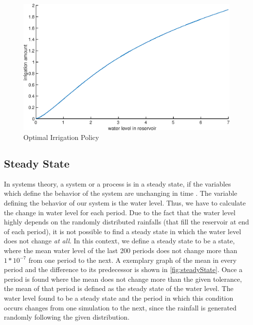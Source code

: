 \documentclass[12pt, a4paper, oneside]{article}
\begin{document}
\begin{figure}[ht]
	\includegraphics[width=1\textwidth]{figures/OptimalIrrigationPolicy.eps}
	\caption{Optimal Irrigation Policy}
	\label{fig:optimal-irrigation-policy}
\end{figure}
\newpage
\subsection{Steady State}
In systems theory, a system or a process is in a steady state, if the variables which define the behavior of the system are unchanging in time \citep{gagniuc2017markov}. 
The variable defining the behavior of our system is the water level. 
Thus, we have to calculate the change in water level for each period. 
Due to the fact that the water level highly depends on the randomly distributed rainfalls (that fill the reservoir at end of each period), it is not possible to find a steady state in which the water level does not change \textit{at all}. 
In this context, we define a steady state to be a state, where the mean water level of the last 200 periods does not change more than $1*10^{-7}$ from one period to the next. %
A exemplary graph of the mean in every period and the difference to its predecessor is shown in \ref{fig:steadyState}.
Once a period is found where the mean does not change more than the given tolerance, the mean of that period is defined as the steady state of the water level. %
The water level found to be a steady state and the period in which this condition occurs changes from one simulation to the next, since the rainfall is generated randomly following the given distribution.
\end{document}
